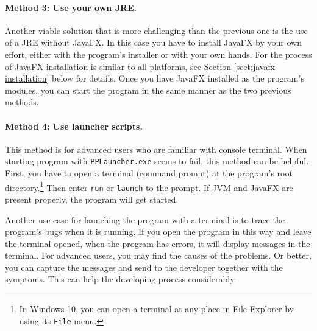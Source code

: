 \newpage
{}

\paragraph{Method 3: Use your own JRE.} Another viable solution that is more challenging than the previous one is the use of a JRE without JavaFX. In this case you have to install JavaFX by your own effort, either with the program's installer or with your own hands. For the process of JavaFX installation is similar to all platforms, see Section \ref{sect:javafx-installation} below for details. Once you have JavaFX installed as the program's modules, you can start the program in the same manner as the two previous methods.

\paragraph{Method 4: Use launcher scripts.} This method is for advanced users who are familiar with console terminal. When starting program with \texttt{PPLauncher.exe} seems to fail, this method can be helpful. First, you have to open a terminal (command prompt) at the program's root directory.\footnote{In Windows 10, you can open a terminal at any place in File Explorer by using its \texttt{File} menu.} Then enter \texttt{run} or \texttt{launch} to the prompt. If JVM and JavaFX are present properly, the program will get started.


Another use case for launching the program with a terminal is to trace the program's bugs when it is running. If you open the program in this way and leave the terminal opened, when the program has errors, it will display messages in the terminal. For advanced users, you may find the causes of the problems. Or better, you can capture the messages and send to the developer together with the symptoms. This can help the developing process considerably.

